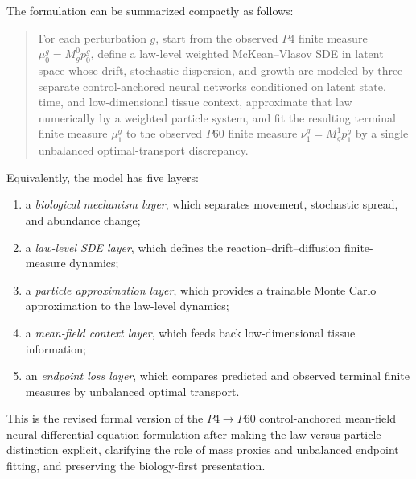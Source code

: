 \documentclass[11pt]{article}
\begin{document}
The formulation can be summarized compactly as follows:

\begin{quote}
For each perturbation $g$, start from the observed $P4$ finite measure $\mu_0^g=M_g^0p_0^g$, define a law-level weighted McKean--Vlasov SDE in latent space whose drift, stochastic dispersion, and growth are modeled by three separate control-anchored neural networks conditioned on latent state, time, and low-dimensional tissue context, approximate that law numerically by a weighted particle system, and fit the resulting terminal finite measure $\mu_1^g$ to the observed $P60$ finite measure $\nu_1^g=M_g^1p_1^g$ by a single unbalanced optimal-transport discrepancy.
\end{quote}

Equivalently, the model has five layers:
\begin{enumerate}[label=(\arabic*),leftmargin=2.2em]
    \item a \emph{biological mechanism layer}, which separates movement, stochastic spread, and abundance change;
    \item a \emph{law-level SDE layer}, which defines the reaction--drift--diffusion finite-measure dynamics;
    \item a \emph{particle approximation layer}, which provides a trainable Monte Carlo approximation to the law-level dynamics;
    \item a \emph{mean-field context layer}, which feeds back low-dimensional tissue information;
    \item an \emph{endpoint loss layer}, which compares predicted and observed terminal finite measures by unbalanced optimal transport.
\end{enumerate}

This is the revised formal version of the $P4 \to P60$ control-anchored mean-field neural differential equation formulation after making the law-versus-particle distinction explicit, clarifying the role of mass proxies and unbalanced endpoint fitting, and preserving the biology-first presentation.
\end{document}
